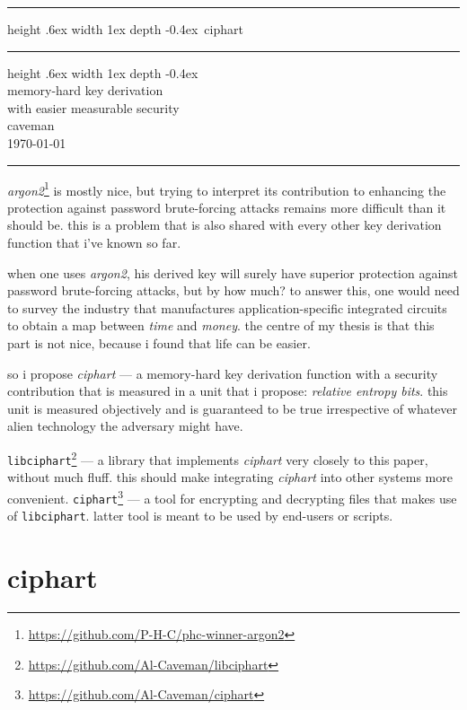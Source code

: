 \documentclass[twocolumn]{article}
\makeatletter
\def\myrulefill{\leavevmode\leaders\hrule height .6ex width 1ex depth -0.4ex\hfill\kern\z@}
\makeatother
\begin{document}

\begin{center}
\Huge
\myrulefill\ ciphart \myrulefill\\
\LARGE
memory-hard key derivation \\
with easier measurable security\\
\normalsize
caveman\\
\today\\
\rule{1\columnwidth}{2pt}
\end{center}

\emph{argon2}\footnote{\url{https://github.com/P-H-C/phc-winner-argon2}}
is mostly nice, but trying to interpret its contribution to enhancing the
protection against password brute-forcing attacks remains more difficult
than it should be.  this is a problem that is also shared with every other
key derivation function that i've known so far.

when one uses \emph{argon2}, his derived key will surely have superior
protection against password brute-forcing attacks, but by how much?  to
answer this, one would need to survey the industry that manufactures
application-specific integrated circuits to obtain a map between
\emph{time} and \emph{money}.  the centre of my thesis is that this part is
not nice, because i found that life can be easier.

so i propose \emph{ciphart} --- a memory-hard key derivation function with
a security contribution that is measured in a unit that i propose:
\emph{relative entropy bits}.  this unit is measured objectively and is
guaranteed to be true irrespective of whatever alien technology the
adversary might have.

\texttt{libciphart}\footnote{\url{https://github.com/Al-Caveman/libciphart}}
--- a library that implements \emph{ciphart} very closely to this paper,
without much fluff.  this should make integrating \emph{ciphart} into other
systems more convenient.
\texttt{ciphart}\footnote{\url{https://github.com/Al-Caveman/ciphart}} ---
a tool for encrypting and decrypting files that makes use of
\texttt{libciphart}.  latter tool is meant to be used by end-users or
scripts.

\tableofcontents
\vfill
\break

\section{ciphart}
\end{document}
